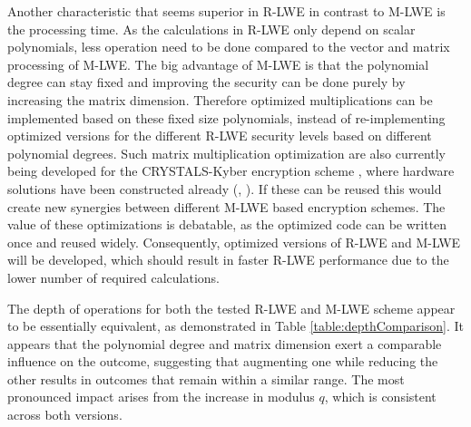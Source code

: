 Another characteristic that seems superior in R-LWE in contrast to M-LWE is the processing time. As the calculations in R-LWE only depend on scalar polynomials, less operation need to be done compared to the vector and matrix processing of M-LWE. The big advantage of M-LWE is that the polynomial degree can stay fixed and improving the security can be done purely by increasing the matrix dimension. Therefore optimized multiplications can be implemented based on these fixed size polynomials, instead of re-implementing optimized versions for the different R-LWE security levels based on different polynomial degrees. Such matrix multiplication optimization are also currently being developed for the CRYSTALS-Kyber encryption scheme \cite{CyrstalsKyber}, where hardware solutions have been constructed already (\cite{KyberHardware}, \cite{KyberHardware2}). If these can be reused this would create new synergies between different M-LWE based encryption schemes. The value of these optimizations is debatable, as the optimized code can be written once and reused widely. Consequently, optimized versions of R-LWE and M-LWE will be developed, which should result in faster R-LWE performance due to the lower number of required calculations.

The depth of operations for both the tested R-LWE and M-LWE scheme appear to be essentially equivalent, as demonstrated in Table \ref{table:depthComparison}. It appears that the polynomial degree and matrix dimension exert a comparable influence on the outcome, suggesting that augmenting one while reducing the other results in outcomes that remain within a similar range. The most pronounced impact arises from the increase in modulus $q$, which is consistent across both versions.

